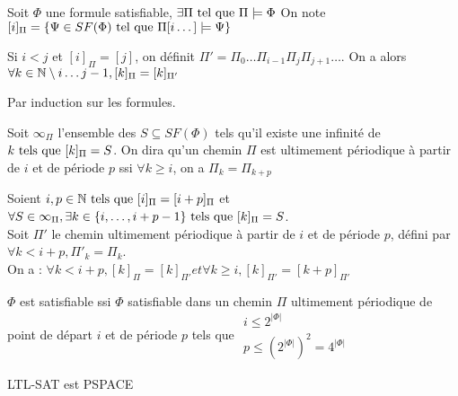 \documentclass[10pt,a4paper]{article}
\begin{document}
\begin{prop}
 Soit $\Phi$ une formule satisfiable, $\exists \Pi \tq \Pi \models \Phi$
On note $[i]_{\Pi} = \{\Psi \in SF(\Phi) \tq \Pi[i \dots] \models \Psi \}$
\end{prop}

\begin{lem}[1]
 Si $i < j$ et $[i]_{\Pi} = [j]$, on définit $\Pi' = \Pi_0 \dots \Pi_{i-1} \Pi_j \Pi_{j+1} \dots$. On a alors 
$\forall k \in \Ns \setminus { i \dots j-1}, [k]_{\Pi} = [k]_{\Pi'}$
\end{lem}
\begin{dem}
 Par induction sur les formules.
\end{dem}
\begin{definition}
 Soit $\infty_{\Pi}$ l'ensemble des $S \subseteq SF(\Phi)$ tels qu'il existe une infinité de $k \tq[s] [k]_{\Pi} = S$. On dira qu'un chemin $\Pi$ est ultimement périodique à partir de $i$ et de période $p$ ssi $\forall k \geq i$, on a $\Pi_k = \Pi_{k+p}$
\end{definition}

\begin{lem}[2]
 Soient $i, p \in \Ns \tq[s] [i]_{\Pi} = [i+p]_{\Pi}$ et $\forall S \in \infty_{\Pi}, \exists k \in \{i, \dots, i+p-1 \} \tq[s] [k]_{\Pi} = S$.\\
Soit $\Pi'$ le chemin ultimement périodique à partir de $i$ et de période $p$, défini par $\forall k < i+p, \Pi'_k = \Pi_k$.\\
On a : $\forall k < i+p, [k]_{\Pi} = [k]_{\Pi'} et \forall k \geq i, [k]_{\Pi'} = [k+p]_{\Pi'}$
\end{lem}

\begin{thm}
 $\Phi$ est satisfiable ssi $\Phi$ satisfiable dans un chemin $\Pi$ ultimement périodique de point de départ $i$ et de période $p$ tels que $\begin{array}{ll}
    i \leq 2^{ | \Phi | }\\
    p \leq (2^{ | \Phi | })^2 = 4^{ | \Phi | }
 \end{array}$

\end{thm}


\begin{thm}
 LTL-SAT est PSPACE
\end{thm}
\end{document}
